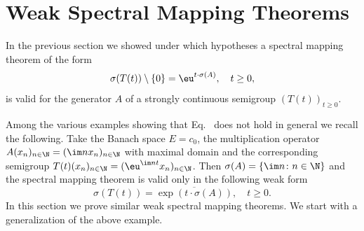 \section{Weak Spectral Mapping Theorems}\label{sec:a3-7}%
In the previous section we showed under which hypotheses a spectral mapping theorem of the form
\begin{equation}\label{eq:a3-7.1}
	\sigma(T(t)) \setminus \{0\} = \eu^{t \cdot \sigma(A)}, \quad t \geq 0 ,
\end{equation}
is valid for the generator $A$ of a strongly continuous semigroup $(T(t))_{t\geq 0}$.

Among the various examples showing that Eq.~ does not hold in general we recall the following.
Take the Banach space $E = c_{0}$, the multiplication operator $A(x_{n})_{n\in\N} = (\im n x_{n})_{n\in\N}$ with maximal domain and the corresponding semigroup $T(t)(x_{n})_{n \in \N} = 
(\eu^{\im nt}x_{n})_{n \in \N}$.
Then $\sigma(A) = \{\im n \colon n \in \N\}$ and the spectral mapping theorem is valid only in the following weak form
\begin{equation}\label{eq:a3-7.2}
	\sigma(T(t)) = \overline{\exp(t\cdot\sigma(A))}, \quad t \geq 0 .
\end{equation}
In this section we prove similar weak spectral mapping theorems.
We start with a generalization of the above example.

